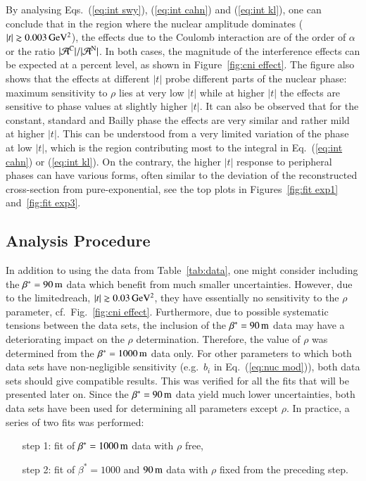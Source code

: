 By analysing Eqs.~(\ref{eq:int swy}), (\ref{eq:int cahn}) and (\ref{eq:int kl}), one can conclude that in the region where the nuclear amplitude dominates ($|t| \gtrsim 0.003\,{\rm GeV^2}$), the effects due to the Coulomb interaction are of the order of $\alpha$ or the ratio $|{\cal A}^{\rm C}| / |{\cal A}^{\rm N}|$. In both cases, the magnitude of the interference effects can be expected at a percent level, as shown in Figure~\ref{fig:cni effect}. The figure also shows that the effects at different $|t|$ probe different parts of the nuclear phase: maximum sensitivity to $\rho$ lies at very low $|t|$ while at higher $|t|$ the effects are sensitive to phase values at slightly higher $|t|$. It can also be observed that for the constant, standard and Bailly phase the effects are very similar and rather mild at higher $|t|$. This can be understood from a very limited variation of the phase at low $|t|$, which is the region contributing most to the integral in Eq.~(\ref{eq:int cahn}) or (\ref{eq:int kl}). On the contrary, the higher $|t|$ response to peripheral phases can have various forms, often similar to the deviation of the reconstructed cross-section from pure-exponential, see the top plots in Figures~\ref{fig:fit exp1} and~\ref{fig:fit exp3}.



\subsection{Analysis Procedure}
\label{sec:cni anal proc}

In addition to using the data from Table~\ref{tab:data}, one might consider including the $\beta^* = 90\,{\rm m}$ data \cite{8tev-90m} which benefit from much smaller uncertainties. However, due to the limited\Break reach, $|t| \gtrsim 0.03\,{\rm GeV^2}$, they have essentially no sensitivity to the $\rho$ parameter, cf.~Fig.~\ref{fig:cni effect}. Furthermore, due to possible systematic tensions between the data sets, the inclusion of the $\beta^* = 90\,{\rm m}$ data may have a deteriorating impact on the $\rho$ determination. Therefore, the value of $\rho$ was determined from the $\beta^* = 1000\,{\rm m}$ data only. For other parameters to which both data sets have non-negligible sensitivity (e.g.~$b_i$ in Eq.~(\ref{eq:nuc mod})), both data sets should give compatible results. This was verified for all the fits that will be presented later on. Since the $\beta^* = 90\,{\rm m}$ data yield much lower uncertainties, both data sets have been used for determining all parameters except $\rho$. In practice, a series of two fits was performed:
\begin{enumerate}[leftmargin=2cm]
\item[step 1:] fit of $\beta^* = 1000\,{\rm m}$ data with $\rho$ free,
\item[step 2:] fit of $\beta^* = 1000$ and $90\,{\rm m}$ data with $\rho$ fixed from the preceding step.
\end{enumerate}

